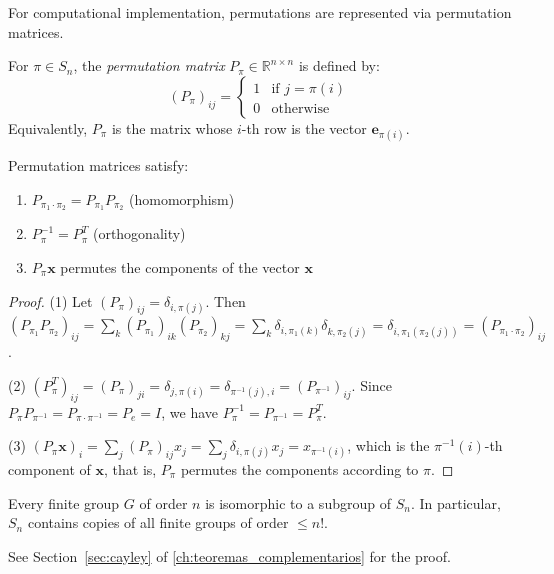 For computational implementation, permutations are represented via permutation matrices.

\begin{definition}\label{def:permutation_matrix}
For $\pi \in S_n$, the \textit{permutation matrix} $P_\pi \in \mathbb{R}^{n \times n}$ is defined by:
\begin{equation}
(P_\pi)_{ij} = \begin{cases}
1 & \text{if } j = \pi(i) \\
0 & \text{otherwise}
\end{cases}
\end{equation}
Equivalently, $P_\pi$ is the matrix whose $i$-th row is the vector $\mathbf{e}_{\pi(i)}$.
\end{definition}

\begin{proposition}\label{prop:permutation_matrix_properties}
Permutation matrices satisfy:
\begin{enumerate}
    \item $P_{\pi_1 \cdot \pi_2} = P_{\pi_1} P_{\pi_2}$ (homomorphism)
    \item $P_\pi^{-1} = P_\pi^T$ (orthogonality)
    \item $P_\pi \mathbf{x}$ permutes the components of the vector $\mathbf{x}$
\end{enumerate}
\end{proposition}

\begin{proof}
(1) Let $(P_\pi)_{ij} = \delta_{i, \pi(j)}$. Then $(P_{\pi_1} P_{\pi_2})_{ij} = \sum_k (P_{\pi_1})_{ik}(P_{\pi_2})_{kj} = \sum_k \delta_{i, \pi_1(k)} \delta_{k, \pi_2(j)} = \delta_{i, \pi_1(\pi_2(j))} = (P_{\pi_1 \cdot \pi_2})_{ij}$.

(2) $(P_\pi^T)_{ij} = (P_\pi)_{ji} = \delta_{j, \pi(i)} = \delta_{\pi^{-1}(j), i} = (P_{\pi^{-1}})_{ij}$. Since $P_\pi P_{\pi^{-1}} = P_{\pi \cdot \pi^{-1}} = P_e = I$, we have $P_\pi^{-1} = P_{\pi^{-1}} = P_\pi^T$.

(3) $(P_\pi \mathbf{x})_i = \sum_j (P_\pi)_{ij} x_j = \sum_j \delta_{i,\pi(j)} x_j = x_{\pi^{-1}(i)}$, which is the $\pi^{-1}(i)$-th component of $\mathbf{x}$, that is, $P_\pi$ permutes the components according to $\pi$.
\end{proof}

\begin{theorem}\label{thm:cayley_symmetric}
Every finite group $G$ of order $n$ is isomorphic to a subgroup of $S_n$. In particular, $S_n$ contains copies of all finite groups of order $\leq n!$.

See Section~\ref{sec:cayley} of \autoref{ch:teoremas_complementarios} for the proof.
\end{theorem}

